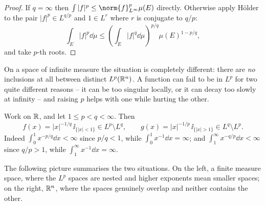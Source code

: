 \documentclass[a4paper]{scrartcl}
\begin{document}
\begin{proof}
	If $q = \infty$ then $\int |f|^p \le \norm{f}_{L^\infty}^p \mu(E)$ directly. Otherwise apply H\"older to the pair $|f|^p \in L^{q/p}$ and $1 \in L^r$ where $r$ is conjugate to $q/p$:
	$$\int_E |f|^p \dd\mu \le \left( \int_E |f|^{q} \dd \mu \right)^{p/q} \mu(E)^{1 - p/q},$$
	and take $p$-th roots.
\end{proof}

On a space of infinite measure the situation is completely different: there are \emph{no} inclusions at all between distinct $L^p(\mathbb{R}^n)$. A function can fail to be in $L^p$ for two quite different reasons -- it can be too singular locally, or it can decay too slowly at infinity -- and raising $p$ helps with one while hurting the other.

\begin{example}\label{ex:noinclusion}
	Work on $\mathbb{R}$, and let $1 \le p < q < \infty$. Then
	$$f(x) = |x|^{-1/q}\, \ii_{\{|x| < 1\}} \in L^p \setminus L^q, \qquad g(x) = |x|^{-1/p} \, \ii_{\{|x| > 1\}} \in L^q \setminus L^p.$$
	Indeed $\int_0^1 x^{-p/q} \dd x < \infty$ since $p/q < 1$, while $\int_0^1 x^{-1}\dd x = \infty$; and $\int_1^\infty x^{-q/p} \dd x < \infty$ since $q/p > 1$, while $\int_1^\infty x^{-1} \dd x = \infty$.
\end{example}

The following picture summarises the two situations. On the left, a finite measure space, where the $L^p$ spaces are nested and higher exponents mean smaller spaces; on the right, $\mathbb{R}^n$, where the spaces genuinely overlap and neither contains the other.

\begin{center}
\end{center}
\end{document}
